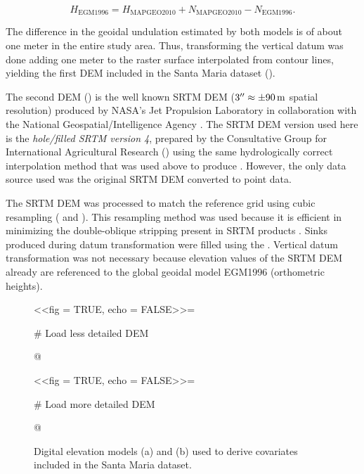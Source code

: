 \begin{equation}
 H_{\text{EGM1996}} = H_{\text{MAPGEO2010}} + N_{\text{MAPGEO2010}} - N_{\text{EGM1996}}.
\end{equation}

\noindent The difference in the geoidal undulation estimated by both models is of about one meter in the 
entire study area. Thus, transforming the vertical datum was done adding one meter to the raster surface 
interpolated from contour lines, yielding the first DEM included in the Santa Maria dataset (\demNew{}).

The second DEM (\demOld{}) is the well known SRTM DEM ($\SI{3}{\arcsecond} \approx \SI{\pm90}{\m}$ spatial 
resolution) produced by NASA’s Jet Propulsion Laboratory in collaboration with the National 
Geospatial\-/Intelligence Agency \cite{RodriguezEtAl2006}. The SRTM DEM version used here is the 
\emph{hole\-/filled SRTM version \num{4}}, prepared by the Consultative Group for International Agricultural 
Research (\cgiar) using the same hydrologically correct interpolation method that was used above to produce 
\demNew{} \cite{ReuterEtAl2007, JarvisEtAl2008}. However, the only data source used was the original SRTM DEM 
converted to point data.

The SRTM DEM was processed to match the reference grid using cubic resampling ( and 
). This resampling method was used because it is efficient in minimizing the 
double-oblique stripping present in SRTM products \cite{Samuel-RosaEtAl2013c}. Sinks produced during datum 
transformation were filled using the . Vertical datum transformation was not necessary 
because elevation values of the SRTM DEM already are referenced to the global geoidal model EGM1996 
(orthometric heights).

\begin{figure}[!ht]
 \centering
 \begin{minipage}[b]{63mm}
  \subcaption{}
  \centering
  <<fig = TRUE, echo = FALSE>>=
   
   # Load less detailed DEM
   
  @
 \end{minipage}
 
 \begin{minipage}[b]{63mm}
  \subcaption{}
  \centering
  <<fig = TRUE, echo = FALSE>>=
   
   # Load more detailed DEM
   
  @
 \end{minipage} 
 \caption{Digital elevation models (a) \demOld{} and (b) \demNew{} used to derive covariates included 
 in the Santa Maria dataset.}
\label{fig:covar-data-dem}
\end{figure}

